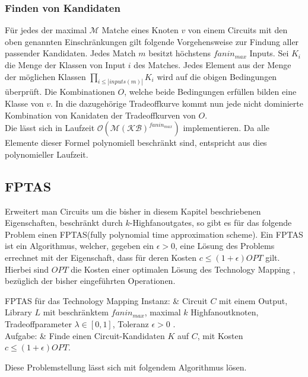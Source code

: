 \documentclass[11pt, a4paper, german]{article}
\newcommand{\TM}{Technology  Mapping }
\begin{document}
\subsubsection{Finden von Kandidaten} 
Für jedes der maximal $\mathcal{M}$ Matche eines Knoten $v$ von einem Circuits mit den oben genannten Einschränkungen gilt folgende Vorgehensweise zur Findung aller passender Kandidaten. Jedes Match $m$ besitzt höchstens $fanin_{max}$ Inputs. Sei $K_i$ die Menge der Klassen von Input $i$ des Matches. Jedes Element aus der Menge der möglichen Klassen $\prod_{i\leq |inputs(m)|} K_i $ wird auf die obigen Bedingungen überprüft. Die Kombinationen $O$, welche beide Bedingungen erfüllen bilden eine Klasse von $v$. In die  dazugehörige Tradeoffkurve kommt nun jede nicht dominierte Kombination von Kanidaten der Tradeoffkurven von $O$. \\
Die lässt sich in Laufzeit $\mathcal{O}(\mathcal{M}(\mathcal{KB})^{fanin_{max}} )$ implementieren. Da alle Elemente dieser Formel polynomiell beschränkt sind, entspricht aus dies polynomieller Laufzeit.
 
\subsection{FPTAS}
\label{subsec:fptas}
Erweitert man Circuits um die bisher in diesem Kapitel beschriebenen Eigenschaften, beschränkt durch $k$-Highfanoutgates, so gibt es für das folgende Problem einen FPTAS(fully polynomial time approximation scheme). Ein FPTAS ist ein Algorithmus, welcher, gegeben ein $\epsilon > 0$, eine Lösung des Problems errechnet mit der Eigenschaft, dass für deren Kosten $c \leq (1+\epsilon)OPT$ gilt. Hierbei sind $OPT$ die Kosten einer optimalen Lösung des \TM , bezüglich der bisher eingeführten Operationen.\\
 \begin{problem}[framed]{FPTAS für das \TM}
  Instanz:  & Circuit $C$ mit einem Output, Library $L$ mit beschr\"anktem $fanin_{max}$, maximal $k$ Highfanoutknoten, Tradeoffparameter $\lambda \in [0,1]$, Toleranz $\epsilon > 0$ .\\
  Aufgabe: &  Finde einen Circuit-Kandidaten $K$ auf $C$, mit Kosten $c \leq (1+\epsilon)OPT$.
\end{problem}
Diese Problemstellung lässt sich mit folgendem Algorithmus lösen.\\
\end{document}
